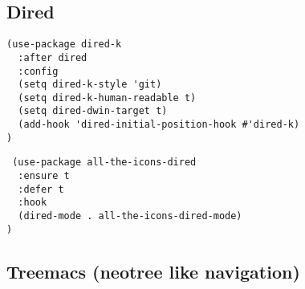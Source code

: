 \documentclass[11pt]{article}
\begin{document}
\subsection*{Dired}
\label{sec:org4410698}

\begin{verbatim}
(use-package dired-k
  :after dired
  :config
  (setq dired-k-style 'git)
  (setq dired-k-human-readable t)
  (setq dired-dwin-target t)
  (add-hook 'dired-initial-position-hook #'dired-k)
)
\end{verbatim}

\begin{verbatim}
 (use-package all-the-icons-dired
  :ensure t
  :defer t
  :hook
  (dired-mode . all-the-icons-dired-mode)
)
\end{verbatim}

\subsection*{Treemacs (neotree like navigation)}
\label{sec:orgdc99c63}
\end{document}
